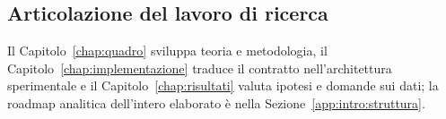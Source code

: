 \begin{onehalfspace}
\section{Articolazione del lavoro di ricerca}

Il Capitolo~\ref{chap:quadro} sviluppa teoria e metodologia, il Capitolo~\ref{chap:implementazione} traduce il contratto nell'architettura sperimentale e il Capitolo~\ref{chap:risultati} valuta ipotesi e domande sui dati; la roadmap analitica dell'intero elaborato è nella Sezione~\ref{app:intro:struttura}.

\end{onehalfspace}
